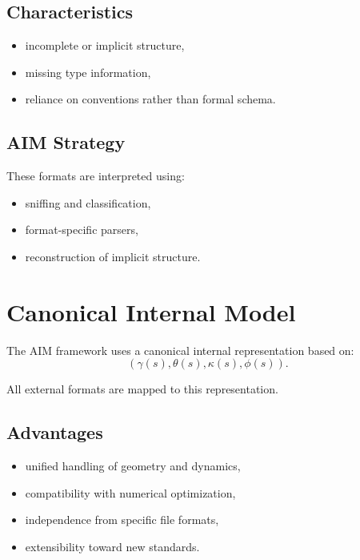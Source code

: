 \subsection{Characteristics}

\begin{itemize}
\item incomplete or implicit structure,
\item missing type information,
\item reliance on conventions rather than formal schema.
\end{itemize}

\subsection{AIM Strategy}

These formats are interpreted using:
\begin{itemize}
\item sniffing and classification,
\item format-specific parsers,
\item reconstruction of implicit structure.
\end{itemize}


\section{Canonical Internal Model}

\begin{definition}
The AIM framework uses a canonical internal representation based on:
\[
(\gamma(s), \theta(s), \kappa(s), \phi(s)).
\]
\end{definition}

All external formats are mapped to this representation.

\subsection{Advantages}

\begin{itemize}
\item unified handling of geometry and dynamics,
\item compatibility with numerical optimization,
\item independence from specific file formats,
\item extensibility toward new standards.
\end{itemize}


